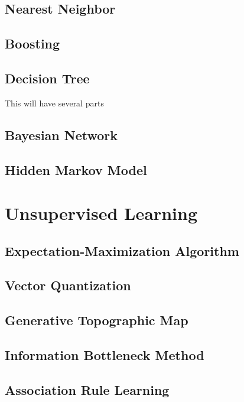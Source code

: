 \documentclass{report}
\begin{document}
	\subsection{Nearest Neighbor}

	\subsection{Boosting}

	\subsection{Decision Tree}
		This will have several parts

	\subsection{Bayesian Network}

	\subsection{Hidden Markov Model}

\section{Unsupervised Learning}

	\subsection{Expectation-Maximization Algorithm}

	\subsection{Vector Quantization}

	\subsection{Generative Topographic Map}

	\subsection{Information Bottleneck Method}

	\subsection{Association Rule Learning}
\end{document}
